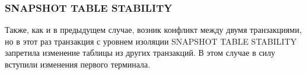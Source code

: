 \subsubsection{SNAPSHOT TABLE STABILITY}





Также, как и в предыдущем случае, возник конфликт между двумя транзакциями, но в этот раз транзакция с уровнем изоляции SNAPSHOT TABLE STABILITY запретила изменение таблицы из других транзакций. В этом случае в силу вступили изменения первого терминала. 